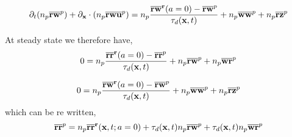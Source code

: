 \begin{equation}
    \partial_t (n_p\overline{\textbf{rw}}^{p} )
    + \partial_{\textbf{x}} \cdot (n_p\overline{\textbf{rw}\textbf{u}}^{p} )
    =  
    n_p 
    \frac{\overline{\textbf{rw}}^{\textbf{r}}(a=0)
    -\overline{\textbf{rw}}^{p} }{\tau_d(\textbf{x},t)}
    + n_p\overline{\textbf{ww}}^{p}
    + n_p\overline{\textbf{rz}}^{p}
\end{equation}


At steady state we therefore have, 
\begin{equation}
    0
    =    
    n_p\frac{\overline{\textbf{rr}}^{\textbf{r}}(a=0)
    - \overline{\textbf{rr}}^{p} }{\tau_d(\textbf{x},t)}
    + n_p\overline{\textbf{rw}}^{p}
    + n_p\overline{\textbf{wr}}^{p}
\end{equation}

\begin{equation}
    0
    =  
    n_p 
    \frac{\overline{\textbf{rw}}^{\textbf{r}}(a=0)
    -\overline{\textbf{rw}}^{p} }{\tau_d(\textbf{x},t)}
    + n_p\overline{\textbf{ww}}^{p}
    + n_p\overline{\textbf{rz}}^{p}
\end{equation}
which can be re written, 
\begin{equation}
    \overline{\textbf{rr}}^{p} 
    =    
    n_p \overline{\textbf{rr}}^{\textbf{r}}(\textbf{x},t;a=0)
    + \tau_d(\textbf{x},t)n_p\overline{\textbf{rw}}^{p}
    + \tau_d(\textbf{x},t)n_p\overline{\textbf{wr}}^{p}
\end{equation}